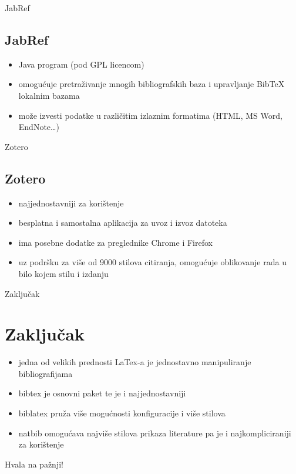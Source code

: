 \documentclass{beamer}
\begin{document}
 

\begin{frame}{JabRef}
\subsection{JabRef}
\begin{itemize}
	\item Java program (pod GPL licencom) \\
	\item omogućuje pretraživanje mnogih bibliografskih baza i upravljanje
	BibTeX lokalnim bazama  \\
	\item može izvesti podatke u različitim izlaznim formatima (HTML, MS Word, EndNote…) \\
\end{itemize}
 \end{frame}

 
\begin{frame}{Zotero}
\subsection{Zotero}
\begin{itemize}
	\item najjednostavniji za korištenje  \\
	\item besplatna i samostalna aplikacija za uvoz i izvoz datoteka \\
	\item ima posebne dodatke za preglednike Chrome i Firefox \\
	\item uz podršku za više od 9000 stilova citiranja, omogućuje oblikovanje
	 rada u bilo kojem stilu i izdanju \\
\end{itemize}
\end{frame}


\begin{frame}{Zaključak}
\section{Zaključak}
\begin{itemize}
	\item jedna od velikih prednosti LaTex-a je jednostavno manipuliranje bibliografijama \\
	\item bibtex je osnovni paket te je i najjednostavniji \\
	\item biblatex pruža više mogućnosti konfiguracije i više stilova \\
	\item natbib omogućava najviše stilova prikaza literature pa je i najkompliciraniji za korištenje \\
\end{itemize}
\end{frame}

\begin{frame}
\printbibliography[title={Literatura}]
\end{frame}

\begin{frame}
Hvala na pažnji!
\end{frame}
\end{document}
